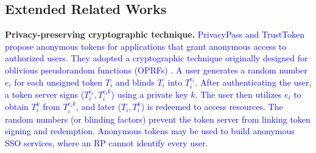 \subsection{Extended Related Works}
\label{sec:related}

%
\noindent\textbf{Privacy-preserving cryptographic technique.}
\textcolor{blue}{PrivacyPass and TrustToken \cite{privacypass,trusttoken}
 propose anonymous tokens for applications that grant anonymous access to authorized users.
They adopted a cryptographic technique originally designed for oblivious pseudorandom functions (OPRFs) \cite{oprf-proved,voprf-proved}.
A user generates a random number $e_i$ for each unsigned token $T_i$ and blinds $T_i$ into $T_i^{e_i}$.
After authenticating the user,
 a token server signs ($T_i^{e_i}, T_i^{e_i k}$) using a private key $k$.
The user then utilizes $e_i$ to obtain $T_i^k$ from $T_i^{e_i k}$, and later ($T_i, T_i^k$) is redeemed to access resources.
The random numbers (or blinding factors) prevent the token server from linking token signing and redemption.
Anonymous tokens may be used to build anonymous SSO services,
    where an RP cannot identify every user.}


